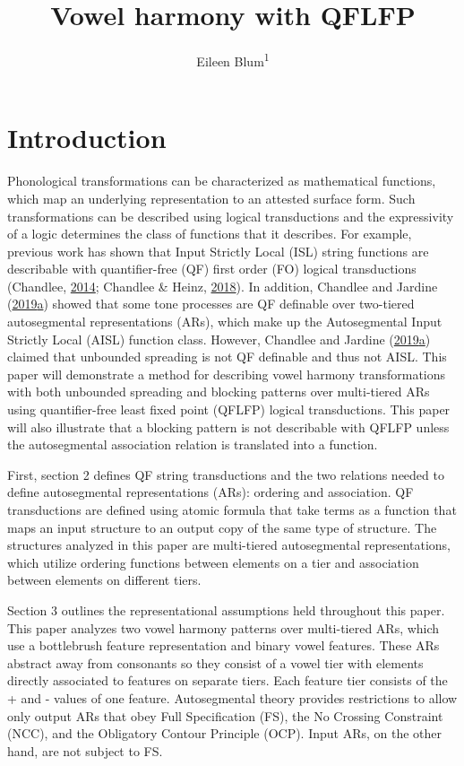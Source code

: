 \documentclass[,doc,floatsintext]{apa6}
\title{Vowel harmony with QFLFP}
\author{Eileen Blum\textsuperscript{1}}
\date{}
\affiliation{
\vspace{0.5cm}
\textsuperscript{1} Rutgers University}
\theoremstyle{definition}
\theoremstyle{definition}
\theoremstyle{definition}
\theoremstyle{remark}
\begin{document}
\maketitle

\section{Introduction}\label{introduction}

Phonological transformations can be characterized as mathematical
functions, which map an underlying representation to an attested surface
form. Such transformations can be described using logical transductions
and the expressivity of a logic determines the class of functions that
it describes. For example, previous work has shown that Input Strictly
Local (ISL) string functions are describable with quantifier-free (QF)
first order (FO) logical transductions (Chandlee,
\protect\hyperlink{ref-chandlee2014}{2014}; Chandlee \& Heinz,
\protect\hyperlink{ref-chandleeheinz2018}{2018}). In addition, Chandlee
and Jardine
(\protect\hyperlink{ref-chandleejardineaisl}{2019}\protect\hyperlink{ref-chandleejardineaisl}{a})
showed that some tone processes are QF definable over two-tiered
autosegmental representations (ARs), which make up the Autosegmental
Input Strictly Local (AISL) function class. However, Chandlee and
Jardine
(\protect\hyperlink{ref-chandleejardineaisl}{2019}\protect\hyperlink{ref-chandleejardineaisl}{a})
claimed that unbounded spreading is not QF definable and thus not AISL.
This paper will demonstrate a method for describing vowel harmony
transformations with both unbounded spreading and blocking patterns over
multi-tiered ARs using quantifier-free least fixed point (QFLFP) logical
transductions. This paper will also illustrate that a blocking pattern
is not describable with QFLFP unless the autosegmental association
relation is translated into a function.

First, section 2 defines QF string transductions and the two relations
needed to define autosegmental representations (ARs): ordering and
association. QF transductions are defined using atomic formula that take
terms as a function that maps an input structure to an output copy of
the same type of structure. The structures analyzed in this paper are
multi-tiered autosegmental representations, which utilize ordering
functions between elements on a tier and association between elements on
different tiers.

Section 3 outlines the representational assumptions held throughout this
paper. This paper analyzes two vowel harmony patterns over multi-tiered
ARs, which use a bottlebrush feature representation and binary vowel
features. These ARs abstract away from consonants so they consist of a
vowel tier with elements directly associated to features on separate
tiers. Each feature tier consists of the + and - values of one feature.
Autosegmental theory provides restrictions to allow only output ARs that
obey Full Specification (FS), the No Crossing Constraint (NCC), and the
Obligatory Contour Principle (OCP). Input ARs, on the other hand, are
not subject to FS.
\end{document}

